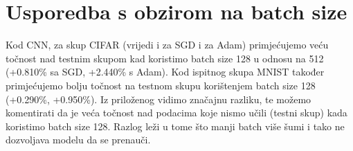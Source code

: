 \bigskip

\section{Usporedba s obzirom na batch size}

Kod CNN, za skup CIFAR (vrijedi i za SGD i za Adam) primjećujemo veću točnost nad testnim skupom kad koristimo batch size 128 u odnosu na 512 (+0.810\% sa SGD, +2.440\% s Adam). Kod ispitnog skupa MNIST također primjećujemo bolju točnost na testnom skupu korištenjem batch size 128 (+0.290\%, +0.950\%). Iz priloženog vidimo značajnu razliku, te možemo komentirati da je veća točnost nad podacima koje nismo učili (testni skup) kada koristimo batch size 128. Razlog leži u tome što manji batch više šumi i tako ne dozvoljava modelu da se prenauči.